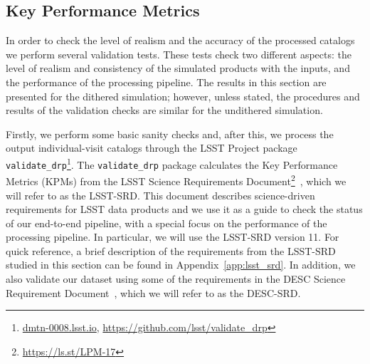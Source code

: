 \documentclass[\docopts]{\docclass}
\begin{document}
\subsection{Key Performance Metrics}

In order to check the level of realism and the accuracy of the processed catalogs we perform several validation tests. These tests check two different aspects: the level of realism and consistency of the simulated products with the inputs, and the performance of the processing pipeline. The results in this section are presented for the dithered simulation; however, unless stated, the procedures and results of the validation checks are similar for the undithered simulation. 


Firstly, we perform some basic sanity checks and, after this, we process the output individual-visit catalogs through the LSST Project package \texttt{validate\_drp}\footnote{\url{dmtn-0008.lsst.io}, \url{https://github.com/lsst/validate_drp}}.
The \texttt{validate\_drp} package calculates the Key Performance Metrics (KPMs) from the LSST Science Requirements Document\footnote{\url{https://ls.st/LPM-17}}~\citep{LPM-17}, which we will refer to as the LSST-SRD. This document describes science-driven requirements for LSST data products and we use it as a guide to check the status of our end-to-end pipeline, with a special focus on the performance of the processing pipeline. In particular, we will use the LSST-SRD version 11. For quick reference, a brief description of the requirements from the LSST-SRD studied in this section can be found in Appendix~\ref{app:lsst_srd}. In addition, we also validate our dataset using some of the requirements in the DESC Science Requirement Document~\citep{2018arXiv180901669T}, which we will refer to as the DESC-SRD.
 
\end{document}
